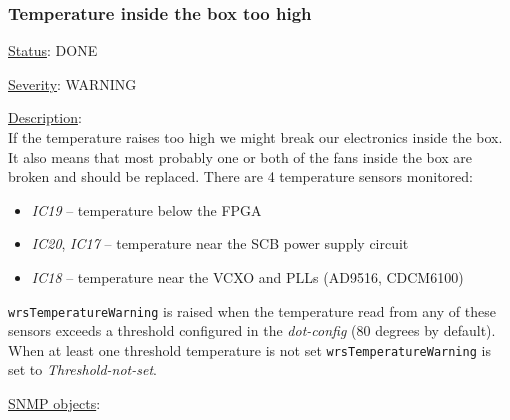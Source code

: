 \subsubsection{\bf Temperature inside the box too high}
		\label{fail:other:temp}
		\begin{pck_descr}
			\item [] \underline{Status}: DONE
			\item [] \underline{Severity}: WARNING
			\item [] \underline{Description}:\\
				If the temperature raises too high we might break our electronics inside
				the box. It also means that most probably one or both of the fans inside
				the box are broken and should be replaced. There are 4 temperature
				sensors monitored:
				\begin{itemize}
					\item \emph{IC19} -- temperature below the FPGA
					\item \emph{IC20}, \emph{IC17} -- temperature near the SCB power supply
						circuit
					\item \emph{IC18} -- temperature near the VCXO and PLLs (AD9516,
						CDCM6100)
				\end{itemize}
				\texttt{wrsTemperatureWarning} is raised when the temperature read from
				any of these sensors exceeds a threshold configured in the
        \emph{dot-config} (80 degrees by default). When at least one threshold
        temperature is not set \texttt{wrsTemperatureWarning} is set to
        \emph{Threshold-not-set}.
			\item [] \underline{SNMP objects}:\\
        {\footnotesize
				\\
				\\
				\\
				\\
				\\
				\\
				\\
				\\
				\\
				\\
         }
		\end{pck_descr}


